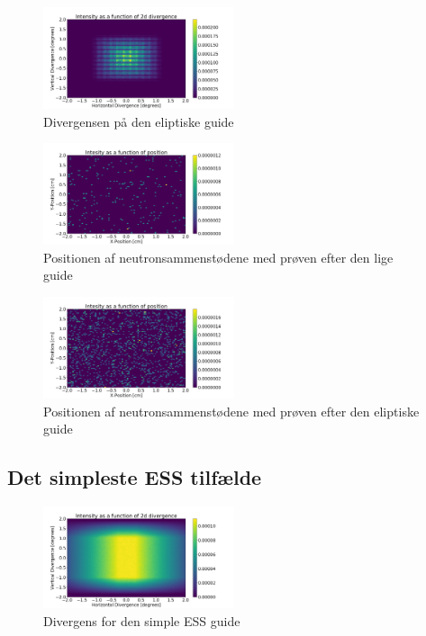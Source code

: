 \documentclass[12pt,oneside,a4paper]{article}
\begin{document}
{{{{{\begin{figure}[H]
\centering
\includegraphics[width=0.5\textwidth]{div_ellipse_after.png}
\caption{Divergensen på den eliptiske guide}
\end{figure}


\begin{figure}[H]
\centering
\includegraphics[width=0.5\textwidth]{psd_straight_after.png}
\caption{Positionen af neutronsammenstødene med prøven efter den lige guide}
\end{figure}

\begin{figure}[H]
\centering
\includegraphics[width=0.5\textwidth]{psd_ellipse_after.png}
\caption{Positionen af neutronsammenstødene med prøven efter den eliptiske guide}
\end{figure}



\subsection{Det simpleste ESS tilfælde}

\begin{figure}[H]
\centering
\includegraphics[width=0.5\textwidth]{div_ess_simple_after.png}
\caption{Divergens for den simple ESS guide}
\end{figure}


}}}}}
\end{document}
